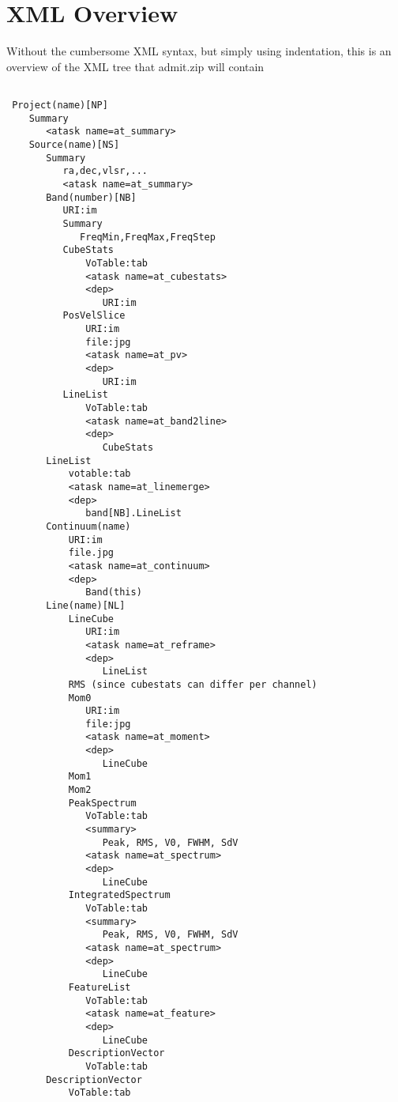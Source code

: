 \documentclass{article}
\begin{document}
 

\section{XML Overview}
Without the cumbersome XML syntax, but simply using indentation, this is
an overview of the XML tree that admit.zip will contain

\newpage

\footnotesize
\begin{verbatim}

 Project(name)[NP]
    Summary
       <atask name=at_summary>
    Source(name)[NS]
       Summary
          ra,dec,vlsr,...
          <atask name=at_summary>
       Band(number)[NB]
          URI:im
          Summary
             FreqMin,FreqMax,FreqStep
          CubeStats
              VoTable:tab
              <atask name=at_cubestats>
              <dep>
                 URI:im
          PosVelSlice
              URI:im
              file:jpg
              <atask name=at_pv>
              <dep>
                 URI:im
          LineList
              VoTable:tab
              <atask name=at_band2line>
              <dep>
                 CubeStats
       LineList
           votable:tab
           <atask name=at_linemerge>
           <dep>
              band[NB].LineList
       Continuum(name)
           URI:im
           file.jpg
           <atask name=at_continuum>
           <dep>
              Band(this)
       Line(name)[NL]
           LineCube
              URI:im
              <atask name=at_reframe>
              <dep>
                 LineList
           RMS (since cubestats can differ per channel)
           Mom0
              URI:im
              file:jpg
              <atask name=at_moment>
              <dep>
                 LineCube
           Mom1
           Mom2
           PeakSpectrum
              VoTable:tab
              <summary>
                 Peak, RMS, V0, FWHM, SdV
              <atask name=at_spectrum>
              <dep>
                 LineCube
           IntegratedSpectrum
              VoTable:tab
              <summary>
                 Peak, RMS, V0, FWHM, SdV
              <atask name=at_spectrum>
              <dep>
                 LineCube
           FeatureList
              VoTable:tab
              <atask name=at_feature>
              <dep>
                 LineCube 
           DescriptionVector
              VoTable:tab
       DescriptionVector
           VoTable:tab

\end{verbatim}
\normalsize
\end{document}
